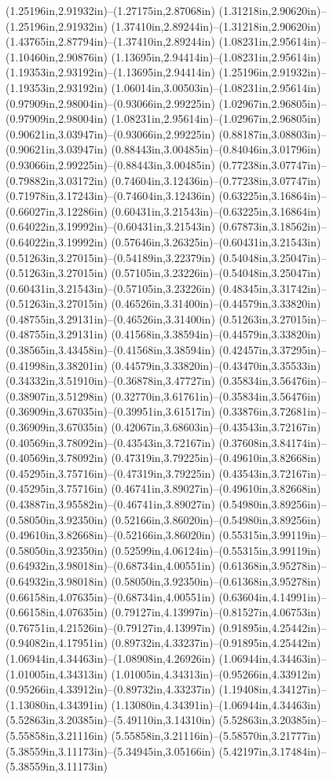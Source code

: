 (1.25196in,2.91932in)--(1.27175in,2.87068in) (1.31218in,2.90620in)--(1.25196in,2.91932in) (1.37410in,2.89244in)--(1.31218in,2.90620in) (1.43765in,2.87794in)--(1.37410in,2.89244in) (1.08231in,2.95614in)--(1.10460in,2.90876in) (1.13695in,2.94414in)--(1.08231in,2.95614in) (1.19353in,2.93192in)--(1.13695in,2.94414in) (1.25196in,2.91932in)--(1.19353in,2.93192in) (1.06014in,3.00503in)--(1.08231in,2.95614in) (0.97909in,2.98004in)--(0.93066in,2.99225in) (1.02967in,2.96805in)--(0.97909in,2.98004in) (1.08231in,2.95614in)--(1.02967in,2.96805in) (0.90621in,3.03947in)--(0.93066in,2.99225in) (0.88187in,3.08803in)--(0.90621in,3.03947in) (0.88443in,3.00485in)--(0.84046in,3.01796in) (0.93066in,2.99225in)--(0.88443in,3.00485in) (0.77238in,3.07747in)--(0.79882in,3.03172in) (0.74604in,3.12436in)--(0.77238in,3.07747in) (0.71978in,3.17243in)--(0.74604in,3.12436in) (0.63225in,3.16864in)--(0.66027in,3.12286in) (0.60431in,3.21543in)--(0.63225in,3.16864in) (0.64022in,3.19992in)--(0.60431in,3.21543in) (0.67873in,3.18562in)--(0.64022in,3.19992in) (0.57646in,3.26325in)--(0.60431in,3.21543in) (0.51263in,3.27015in)--(0.54189in,3.22379in) (0.54048in,3.25047in)--(0.51263in,3.27015in) (0.57105in,3.23226in)--(0.54048in,3.25047in) (0.60431in,3.21543in)--(0.57105in,3.23226in) (0.48345in,3.31742in)--(0.51263in,3.27015in) (0.46526in,3.31400in)--(0.44579in,3.33820in) (0.48755in,3.29131in)--(0.46526in,3.31400in) (0.51263in,3.27015in)--(0.48755in,3.29131in) (0.41568in,3.38594in)--(0.44579in,3.33820in) (0.38565in,3.43458in)--(0.41568in,3.38594in) (0.42457in,3.37295in)--(0.41998in,3.38201in) (0.44579in,3.33820in)--(0.43470in,3.35533in) (0.34332in,3.51910in)--(0.36878in,3.47727in) (0.35834in,3.56476in)--(0.38907in,3.51298in) (0.32770in,3.61761in)--(0.35834in,3.56476in) (0.36909in,3.67035in)--(0.39951in,3.61517in) (0.33876in,3.72681in)--(0.36909in,3.67035in) (0.42067in,3.68603in)--(0.43543in,3.72167in) (0.40569in,3.78092in)--(0.43543in,3.72167in) (0.37608in,3.84174in)--(0.40569in,3.78092in) (0.47319in,3.79225in)--(0.49610in,3.82668in) (0.45295in,3.75716in)--(0.47319in,3.79225in) (0.43543in,3.72167in)--(0.45295in,3.75716in) (0.46741in,3.89027in)--(0.49610in,3.82668in) (0.43887in,3.95582in)--(0.46741in,3.89027in) (0.54980in,3.89256in)--(0.58050in,3.92350in) (0.52166in,3.86020in)--(0.54980in,3.89256in) (0.49610in,3.82668in)--(0.52166in,3.86020in) (0.55315in,3.99119in)--(0.58050in,3.92350in) (0.52599in,4.06124in)--(0.55315in,3.99119in) (0.64932in,3.98018in)--(0.68734in,4.00551in) (0.61368in,3.95278in)--(0.64932in,3.98018in) (0.58050in,3.92350in)--(0.61368in,3.95278in) (0.66158in,4.07635in)--(0.68734in,4.00551in) (0.63604in,4.14991in)--(0.66158in,4.07635in) (0.79127in,4.13997in)--(0.81527in,4.06753in) (0.76751in,4.21526in)--(0.79127in,4.13997in) (0.91895in,4.25442in)--(0.94082in,4.17951in) (0.89732in,4.33237in)--(0.91895in,4.25442in) (1.06944in,4.34463in)--(1.08908in,4.26926in) (1.06944in,4.34463in)--(1.01005in,4.34313in) (1.01005in,4.34313in)--(0.95266in,4.33912in) (0.95266in,4.33912in)--(0.89732in,4.33237in) (1.19408in,4.34127in)--(1.13080in,4.34391in) (1.13080in,4.34391in)--(1.06944in,4.34463in) (5.52863in,3.20385in)--(5.49110in,3.14310in) (5.52863in,3.20385in)--(5.55858in,3.21116in) (5.55858in,3.21116in)--(5.58570in,3.21777in) (5.38559in,3.11173in)--(5.34945in,3.05166in) (5.42197in,3.17484in)--(5.38559in,3.11173in) 